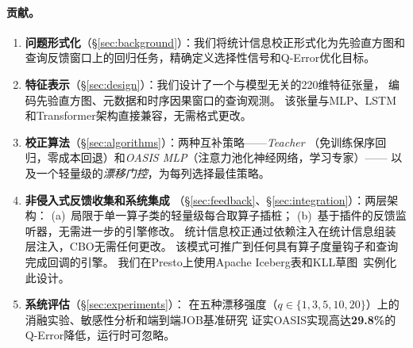 \documentclass[runningheads]{llncs}
\begin{document}
\paragraph{贡献。}
\begin{enumerate}
  \item \textbf{问题形式化}（\S\ref{sec:background}）：我们将统计信息校正形式化为先验直方图和
        查询反馈窗口上的回归任务，精确定义选择性信号和Q-Error优化目标。

  \item \textbf{特征表示}（\S\ref{sec:design}）：我们设计了一个与模型无关的220维特征张量，
        编码先验直方图、元数据和时序因果窗口的查询观测。
        该张量与MLP、LSTM和Transformer架构直接兼容，无需格式更改。

  \item \textbf{校正算法}（\S\ref{sec:algorithms}）：两种互补策略——\emph{Teacher}
        （免训练保序回归，零成本回退）和\emph{OASIS MLP}（注意力池化神经网络，学习专家）——
        以及一个轻量级的\emph{漂移门控}，为每列选择最佳策略。

  \item \textbf{非侵入式反馈收集和系统集成}
        （\S\ref{sec:feedback}、\S\ref{sec:integration}）：两层架构：
        (a)~局限于单一算子类的轻量级每合取算子插桩；
        (b)~基于插件的反馈监听器，无需进一步的引擎修改。
        统计信息校正通过依赖注入在统计信息组装层注入，CBO无需任何更改。
        该模式可推广到任何具有算子度量钩子和查询完成回调的引擎。
        我们在Presto上使用Apache Iceberg表和KLL草图~\cite{ivkin2019kll}实例化此设计。

  \item \textbf{系统评估}（\S\ref{sec:experiments}）：
        在五种漂移强度（$q\in\{1,3,5,10,20\}$）上的消融实验、敏感性分析和端到端JOB基准研究
        证实OASIS实现高达\textbf{29.8\%}的Q-Error降低，运行时可忽略。
\end{enumerate}
\end{document}
